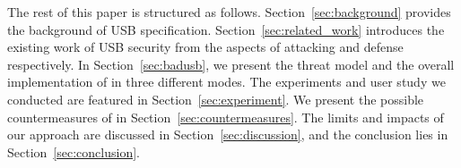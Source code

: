 The rest of this paper is structured as follows.
Section~\ref{sec:background} provides the background of USB specification.
Section~\ref{sec:related_work} introduces the existing work of USB security from the aspects of attacking and defense respectively.
In Section~\ref{sec:badusb}, we present the threat model and the overall implementation of \tool in three different modes.
The experiments and user study we conducted are featured in Section~\ref{sec:experiment}.
We present the possible countermeasures of \tool in Section~\ref{sec:countermeasures}.
The limits and impacts of our approach are discussed in Section~\ref{sec:discussion}, and the conclusion lies in Section~\ref{sec:conclusion}.














